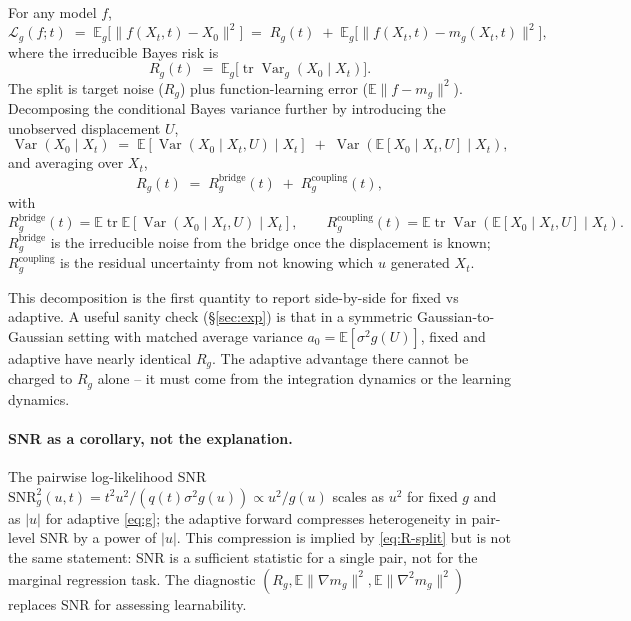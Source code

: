 \documentclass[11pt]{article}
\newcommand{\E}{\mathbb{E}}
\newcommand{\Var}{\operatorname{Var}}
\newcommand{\tr}{\operatorname{tr}}
\begin{document}
For any model $f$,
\begin{equation}
    \mathcal{L}_g(f;t)
    \;=\; \E_g\!\big[\|f(X_t,t)-X_0\|^2\big]
    \;=\; R_g(t) \;+\; \E_g\!\big[\|f(X_t,t)-m_g(X_t,t)\|^2\big],
    \label{eq:bias-var}
\end{equation}
where the irreducible Bayes risk is
\begin{equation}
    R_g(t) \;=\; \E_g\!\big[\tr\Var_g(X_0\mid X_t)\big].
    \label{eq:R}
\end{equation}
The split is target noise ($R_g$) plus function-learning error
($\E\|f - m_g\|^2$). Decomposing the conditional Bayes variance further
by introducing the unobserved displacement $U$,
\begin{equation}
    \Var(X_0\mid X_t) \;=\; \E[\Var(X_0\mid X_t,U)\mid X_t]
    \;+\; \Var(\E[X_0\mid X_t,U]\mid X_t),
    \label{eq:totvar}
\end{equation}
and averaging over $X_t$,
\begin{equation}
    \boxed{
    R_g(t) \;=\; R_g^{\text{bridge}}(t)\;+\;R_g^{\text{coupling}}(t),
    }
    \label{eq:R-split}
\end{equation}
with
\[
    R_g^{\text{bridge}}(t) = \E\tr\E[\Var(X_0\mid X_t,U)\mid X_t],
    \qquad
    R_g^{\text{coupling}}(t) = \E\tr\Var(\E[X_0\mid X_t,U]\mid X_t).
\]
$R_g^{\text{bridge}}$ is the irreducible noise from the bridge once the
displacement is known; $R_g^{\text{coupling}}$ is the residual
uncertainty from not knowing which $u$ generated $X_t$.

This decomposition is the first quantity to report side-by-side for
fixed vs adaptive. A useful sanity check (\S\ref{sec:exp}) is that in a
symmetric Gaussian-to-Gaussian setting with matched average variance
$a_0 = \E[\sigma^2 g(U)]$, fixed and adaptive have nearly identical
$R_g$. The adaptive advantage there cannot be charged to $R_g$ alone --
it must come from the integration dynamics or the learning dynamics.

\paragraph{SNR as a corollary, not the explanation.} The pairwise
log-likelihood SNR $\mathrm{SNR}^2_g(u,t) = t^2 u^2 / (q(t) \sigma^2 g(u))
\propto u^2/g(u)$ scales as $u^2$ for fixed $g$ and as $|u|$ for adaptive
\eqref{eq:g}; the adaptive forward compresses heterogeneity in
pair-level SNR by a power of $|u|$. This compression is implied by
\eqref{eq:R-split} but is not the same statement: SNR is a sufficient
statistic for a single pair, not for the marginal regression task. The
diagnostic $(R_g, \E\|\nabla m_g\|^2, \E\|\nabla^2 m_g\|^2)$ replaces
SNR for assessing learnability.
\end{document}
